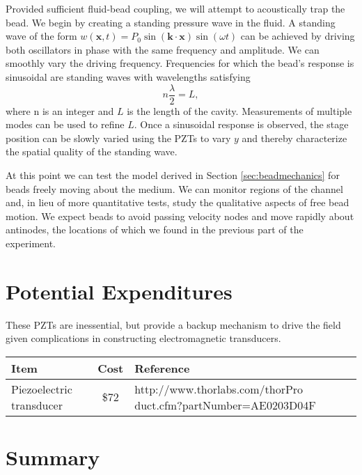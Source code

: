Provided sufficient fluid-bead coupling, we will attempt to acoustically trap the bead.  We begin by creating a standing pressure wave in the fluid. A standing wave of the form $w(\mathbf{x},t) = P_0\sin\left(\mathbf{k}\cdot\mathbf{x}\right)\sin\left(\omega t\right)$ can be achieved by driving both oscillators in phase with the same frequency and amplitude.  We can smoothly vary the driving frequency.  Frequencies for which the bead's response is sinusoidal are standing waves with wavelengths satisfying
\begin{equation}
n \frac{\lambda}{2} = L,
\end{equation}
where n is an integer and $L$ is the length of the cavity.  Measurements of multiple modes can be used to refine $L$.  Once a sinusoidal response is observed, the stage position can be slowly varied using the PZTs to vary $y$ and thereby characterize the spatial quality of the standing wave.  

At this point we can test the model derived in Section \ref{sec:beadmechanics} for beads freely moving about the medium.  We can monitor regions of the channel and, in lieu of more quantitative tests, study the qualitative aspects of free bead motion.  We expect beads to avoid passing velocity nodes and move rapidly about antinodes, the locations of which we found in the previous part of the experiment.

\section{Potential Expenditures}

These PZTs are inessential, but provide a backup mechanism to drive the field given complications in constructing electromagnetic transducers.

\begin{tabular}{ | p{2.1cm} | c | p{5.7cm} | }
\hline
\textbf{Item} & \textbf{Cost} & \textbf{Reference} \\\hline
Piezoelectric transducer & \$72 & http://www.thorlabs.com/thorPro duct.cfm?partNumber=AE0203D04F \\\hline
\end{tabular}

\section{Summary}

